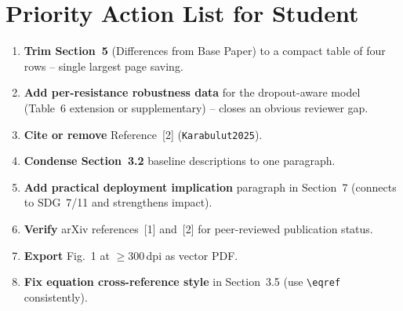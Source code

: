 \documentclass[11pt,a4paper]{article}
\begin{document}
\section{Priority Action List for Student}

\begin{tcolorbox}[colback=red!5,colframe=critred,
  fonttitle=\bfseries\color{critred},
  title={Must-Do Before Resubmission (in priority order)}]
\begin{enumerate}[leftmargin=*]
  \item \textbf{Trim Section~5} (Differences from Base Paper) to a compact
    table of four rows -- single largest page saving.
  \item \textbf{Add per-resistance robustness data} for the dropout-aware
    model (Table~6 extension or supplementary) -- closes an obvious reviewer gap.
  \item \textbf{Cite or remove} Reference~[2] (\texttt{Karabulut2025}).
  \item \textbf{Condense Section~3.2} baseline descriptions to one paragraph.
  \item \textbf{Add practical deployment implication} paragraph in Section~7
    (connects to SDG~7/11 and strengthens impact).
  \item \textbf{Verify} arXiv references~[1] and~[2] for peer-reviewed
    publication status.
  \item \textbf{Export} Fig.~1 at $\geq$300\,dpi as vector PDF.
  \item \textbf{Fix equation cross-reference style} in Section~3.5
    (use \texttt{\textbackslash eqref} consistently).
\end{enumerate}
\end{tcolorbox}
\end{document}
